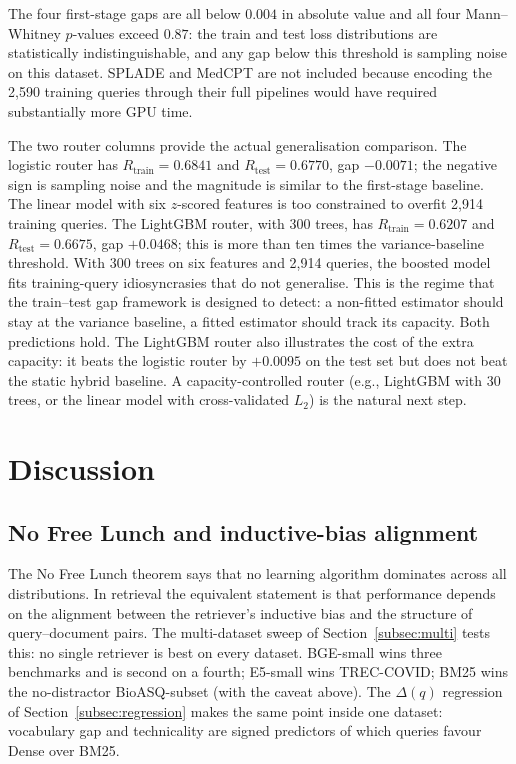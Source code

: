 \documentclass[11pt,a4paper]{article}
\begin{document}
The four first-stage gaps are all below $0.004$ in absolute value and
all four Mann--Whitney $p$-values exceed $0.87$: the train and test
loss distributions are statistically indistinguishable, and any gap
below this threshold is sampling noise on this dataset. SPLADE and
MedCPT are not included because encoding the 2{,}590 training queries
through their full pipelines would have required substantially more
GPU time.

The two router columns provide the actual generalisation comparison.
The logistic router has $R_{\text{train}} = 0.6841$ and
$R_{\text{test}} = 0.6770$, gap $-0.0071$; the negative sign is
sampling noise and the magnitude is similar to the first-stage
baseline. The linear model with six $z$-scored features is too
constrained to overfit 2{,}914 training queries. The LightGBM router,
with 300 trees, has $R_{\text{train}} = 0.6207$ and $R_{\text{test}} =
0.6675$, gap $+0.0468$; this is more than ten times the
variance-baseline threshold. With 300 trees on six features and
2{,}914 queries, the boosted model fits training-query idiosyncrasies
that do not generalise. This is the regime that the
train--test gap framework is designed to detect: a non-fitted
estimator should stay at the variance baseline, a fitted estimator
should track its capacity. Both predictions hold. The LightGBM router
also illustrates the cost of the extra capacity: it beats the logistic
router by $+0.0095$ on the test set but does not beat the static
hybrid baseline. A capacity-controlled router (e.g., LightGBM with 30
trees, or the linear model with cross-validated $L_2$) is the natural
next step.

\section{Discussion}
\label{sec:theory}

\subsection{No Free Lunch and inductive-bias alignment}

The No Free Lunch theorem says that no learning algorithm dominates
across all distributions. In retrieval the equivalent statement is
that performance depends on the alignment between the retriever's
inductive bias and the structure of query--document pairs. The
multi-dataset sweep of Section~\ref{subsec:multi} tests this:
no single retriever is best on every dataset. BGE-small wins three
benchmarks and is second on a fourth; E5-small wins TREC-COVID; BM25
wins the no-distractor BioASQ-subset (with the caveat above). The
$\Delta(q)$ regression of Section~\ref{subsec:regression} makes the
same point inside one dataset: vocabulary gap and technicality are
signed predictors of which queries favour Dense over BM25.
\end{document}
